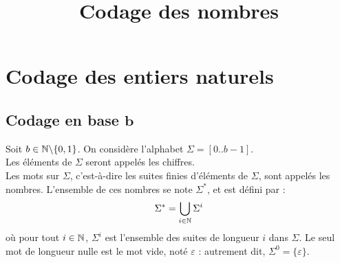 

\DeclareMathOperator{\val}{val}
\DeclareMathOperator{\ecr}{ecr}
\let\eval\relax
\DeclareMathOperator{\eval}{eval}
\DeclareMathOperator{\im}{im}
\DeclareMathOperator{\comp}{comp}
\DeclareMathOperator{\add}{add}


	
\title{Codage des nombres}
	
%
%		
%			
	
\section{Codage des entiers naturels}

	\subsection{Codage en base \(\bm{b}\)}
		
		\eqskip{2mm}
		Soit \(b\in\mathbb{N}\backslash\{0,1\}\). On considère l'alphabet \(\Sigma = [0..b-1]\). \\
		\bdot Les éléments de \(\Sigma\) seront appelés les chiffres. \\
		\bdot Les mots sur \(\Sigma\), c'est-à-dire les suites finies d'éléments de \(\Sigma\), sont appelés les nombres. L'ensemble de ces nombres se note \(\Sigma^*\), et est défini par :
		\[
		\Sigma^* = \bigcup_{i\in\mathbb{N}} \Sigma^i
		\]
		où pour tout \(i\in\mathbb{N}\), \(\Sigma^i\) est l'ensemble des suites de longueur \(i\) dans \(\Sigma\). \nt
		Le seul mot de longueur nulle est le mot vide, noté \(\varepsilon\) : autrement dit, \(\Sigma^0 = \{\varepsilon\}\).
		

